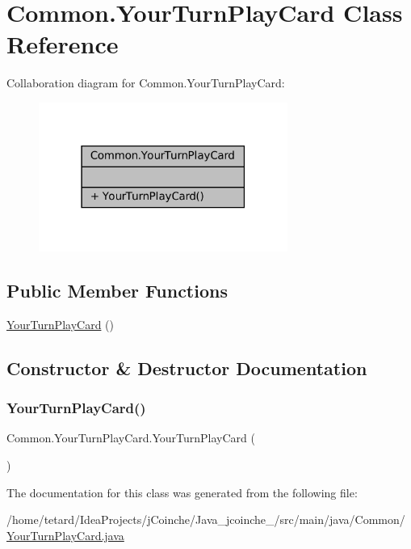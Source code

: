 \hypertarget{classCommon_1_1YourTurnPlayCard}{}\section{Common.\+Your\+Turn\+Play\+Card Class Reference}
\label{classCommon_1_1YourTurnPlayCard}


Collaboration diagram for Common.\+Your\+Turn\+Play\+Card\+:
\nopagebreak
\begin{figure}[H]
\begin{center}
\leavevmode
\includegraphics[width=231pt]{classCommon_1_1YourTurnPlayCard__coll__graph}
\end{center}
\end{figure}
\subsection*{Public Member Functions}
\begin{DoxyCompactItemize}
\item 
\mbox{\hyperlink{classCommon_1_1YourTurnPlayCard_a36903808aca7fc6f7283902396a9ee40}{Your\+Turn\+Play\+Card}} ()
\end{DoxyCompactItemize}


\subsection{Constructor \& Destructor Documentation}
\mbox{\label{classCommon_1_1YourTurnPlayCard_a36903808aca7fc6f7283902396a9ee40}} 
\subsubsection{\texorpdfstring{Your\+Turn\+Play\+Card()}{YourTurnPlayCard()}}
{\footnotesize\ttfamily Common.\+Your\+Turn\+Play\+Card.\+Your\+Turn\+Play\+Card (\begin{DoxyParamCaption}{ }\end{DoxyParamCaption})\hspace{0.3cm}{\ttfamily [inline]}}



The documentation for this class was generated from the following file\+:\begin{DoxyCompactItemize}
\item 
/home/tetard/\+Idea\+Projects/j\+Coinche/\+Java\+\_\+jcoinche\+\_/src/main/java/\+Common/\mbox{\hyperlink{YourTurnPlayCard_8java}{Your\+Turn\+Play\+Card.\+java}}\end{DoxyCompactItemize}
